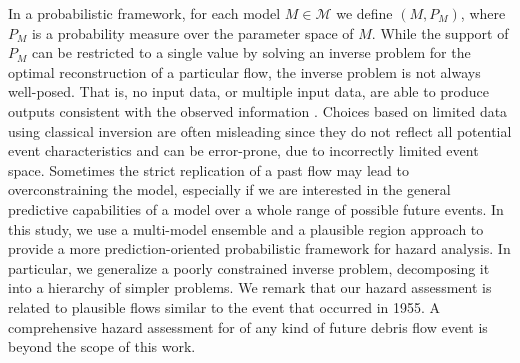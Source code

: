\documentclass[nhess, manuscript]{copernicus}
\begin{document}
In a probabilistic framework, for each model $M\in\mathcal M$ we define $\left(M, P_{M}\right)$, where $P_M$ is a probability measure over the parameter space of $M$. While the support of $P_M$ can be restricted to a single value by solving an inverse problem for the optimal reconstruction of a particular flow, the inverse problem is not always well-posed. That is, no input data, or multiple input data, are able to produce outputs consistent with the observed information \citep{Tarantola1982,  Tarantola1987}. Choices based on limited data using classical inversion are often misleading since they do not reflect all potential event characteristics and can be error-prone, due to incorrectly limited event space. Sometimes the strict replication of a past flow may lead to overconstraining the model, especially if we are interested in the general predictive capabilities of a model over a whole range of possible future events. In this study, we use a multi-model ensemble and a plausible region approach to provide a more prediction-oriented probabilistic framework for hazard analysis. In particular, we generalize a poorly constrained inverse problem, decomposing it into a hierarchy of simpler problems. We remark that our hazard assessment is related to plausible flows similar to the event that occurred in 1955. A comprehensive hazard assessment for of any kind of future debris flow event is beyond the scope of this work.
\end{document}
